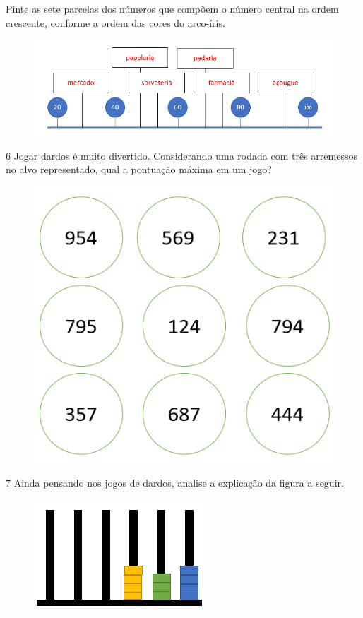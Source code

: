 Pinte as sete parcelas dos números que compõem o número central na ordem
crescente, conforme a ordem das cores do arco-íris.

\begin{figure}[htpb!]
\includegraphics[width=\textwidth]{./media/image22.png}
\end{figure}

\pagebreak

\num{6} Jogar dardos é muito divertido. Considerando uma rodada com três arremessos no alvo representado, qual a pontuação máxima em um jogo?

\begin{figure}[htpb!]
\centering
\includegraphics[width=.4\textwidth]{./media/image23.png}
\end{figure}


\num{7} Ainda pensando nos jogos de dardos, analise a explicação da figura a seguir.

\begin{figure}[htpb!]
\centering
\includegraphics[width=.6\textwidth]{./media/image24.png}
\end{figure}


